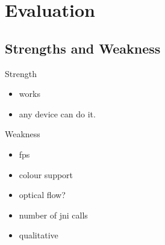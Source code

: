 \section{Evaluation}
\subsection{Strengths and Weakness}
Strength
\begin{itemize}
\item works
\item any device can do it.
\end{itemize}
Weakness
\begin{itemize}
\item fps
\item colour support
\item optical flow?
\item number of jni calls
\item qualitative
\end{itemize}